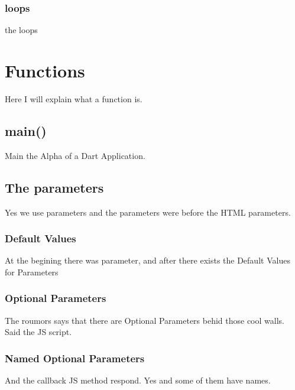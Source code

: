 \documentclass[10pt]{book}
\begin{document}
\subsubsection{loops}
the loops



\section{Functions}
Here I will explain what a function is.
\subsection{main()}
Main the Alpha of a Dart Application.
\subsection{The parameters}
Yes we use parameters and the parameters were before the HTML parameters.
\subsubsection{Default Values}
At the begining there was parameter, and after there exists the Default Values for Parameters
\subsubsection{Optional Parameters}
The roumors says that there are Optional Parameters behid those cool walls. Said the JS script.
\subsubsection{Named Optional Parameters}
And the callback JS method respond. Yes and some of them have names.
\end{document}
